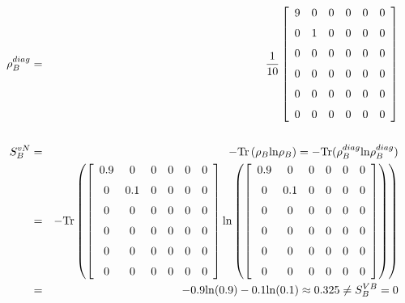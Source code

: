 \begin{eqnarray*}
\rho^{diag}_B &=& \frac{1}{10}\left[ \begin {array}{cccccc}
			9&0&0&0&0&0\\
			\noalign{\medskip}
			0&1&0&0&0&0 \\ \noalign{\medskip}
			0&0&0&0&0&0 \\ \noalign{\medskip}
			0&0&0&0&0&0 \\ \noalign{\medskip}
			0&0&0&0&0&0 \\ \noalign{\medskip}
			0&0&0&0&0&0
			\end {array}
			\right] \\ \\
S^{vN}_B &=& - {\rm Tr}\left(\rho_B{\rm ln} \rho_B\right) =   - {\rm Tr}(\rho^{diag}_B{\rm ln} \rho^{diag}_B) \\
		&=& - {\rm Tr}\left(\left[ \begin {array}{cccccc}
			0.9&0&0&0&0&0\\
			\noalign{\medskip}
			0&0.1&0&0&0&0 \\ \noalign{\medskip}
			0&0&0&0&0&0 \\ \noalign{\medskip}
			0&0&0&0&0&0 \\ \noalign{\medskip}
			0&0&0&0&0&0 \\ \noalign{\medskip}
			0&0&0&0&0&0
			\end {array}
			\right] 
			{\rm ln}\left(\left[ \begin {array}{cccccc}
			0.9&0&0&0&0&0\\
			\noalign{\medskip}
			0&0.1&0&0&0&0 \\ \noalign{\medskip}
			0&0&0&0&0&0 \\ \noalign{\medskip}
			0&0&0&0&0&0 \\ \noalign{\medskip}
			0&0&0&0&0&0 \\ \noalign{\medskip}
			0&0&0&0&0&0
			\end {array}
			\right] \right)\right) \\
		&=& -0.9{\rm ln}(0.9) - 0.1{\rm ln}(0.1) \approx 0.325 \neq S^{VB}_B = 0
\end{eqnarray*}


